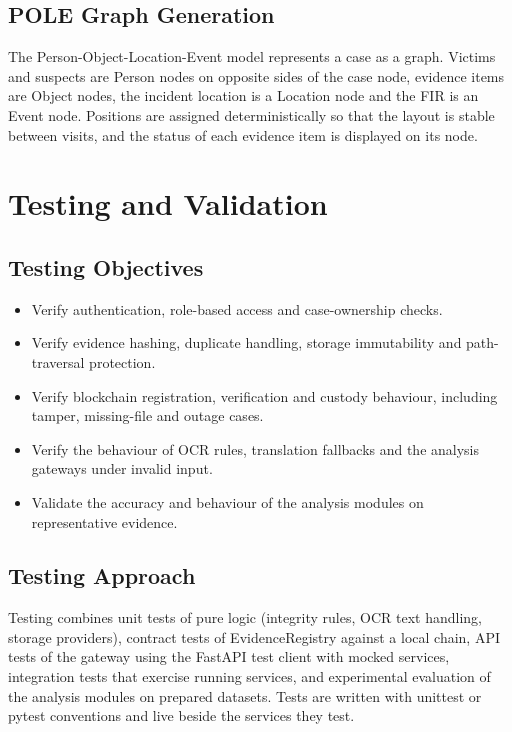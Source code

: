 \documentclass[12pt,a4paper,oneside]{report}
\newcommand{\code}[1]{{\small\ttfamily #1}}
\begin{document}
\section{POLE Graph Generation}
The Person-Object-Location-Event model represents a case as a graph. Victims and suspects are Person nodes on opposite sides of the case node, evidence items are Object nodes, the incident location is a Location node and the FIR is an Event node. Positions are assigned deterministically so that the layout is stable between visits, and the status of each evidence item is displayed on its node.

\chapter{Testing and Validation}
\section{Testing Objectives}
\begin{itemize}
  \item Verify authentication, role-based access and case-ownership checks.
  \item Verify evidence hashing, duplicate handling, storage immutability and path-traversal protection.
  \item Verify blockchain registration, verification and custody behaviour, including tamper, missing-file and outage cases.
  \item Verify the behaviour of OCR rules, translation fallbacks and the analysis gateways under invalid input.
  \item Validate the accuracy and behaviour of the analysis modules on representative evidence.
\end{itemize}

\section{Testing Approach}
Testing combines unit tests of pure logic (integrity rules, OCR text handling, storage providers), contract tests of EvidenceRegistry against a local chain, API tests of the gateway using the FastAPI test client with mocked services, integration tests that exercise running services, and experimental evaluation of the analysis modules on prepared datasets. Tests are written with \code{unittest} or \code{pytest} conventions and live beside the services they test.
\end{document}
